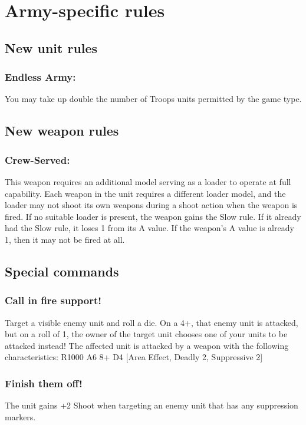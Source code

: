 \section*{Army-specific rules}

\subsection*{New unit rules}

\subsubsection*{Endless Army:} You may take up double the number of Troops units permitted by the game type.

\subsection*{New weapon rules}

\subsubsection*{Crew-Served:} This weapon requires an additional model serving as a loader to operate at full capability. Each weapon in the unit requires a different loader model, and the loader may not shoot its own weapons during a shoot action when the weapon is fired. If no suitable loader is present, the weapon gains the Slow rule. If it already had the Slow rule, it loses 1 from its A value. If the weapon's A value is already 1, then it may not be fired at all.

\subsection*{Special commands}

\subsubsection*{Call in fire support!} Target a visible enemy unit and roll a die. On a 4+, that enemy unit is attacked, but on a roll of 1, the owner of the target unit chooses one of your units to be attacked instead! The affected unit is attacked by a weapon with the following characteristics: R1000 A6 8+ D4 [Area Effect, Deadly 2, Suppressive 2]

\subsubsection*{Finish them off!} The unit gains +2 Shoot when targeting an enemy unit that has any suppression markers.


